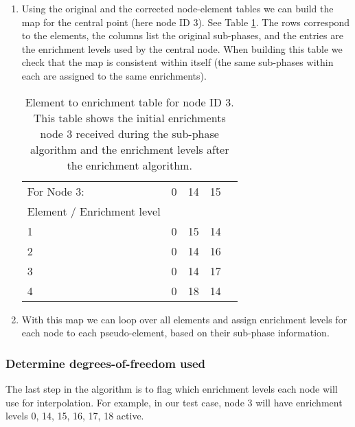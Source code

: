 \begin{enumerate}
\item Using the original and the corrected node-element tables we can build the map for the central point (here node ID 3). See Table \ref{tab:element-to-enrichment-table}. The rows correspond to the elements, the columns list the original sub-phases, and the entries are the enrichment levels used by the central node. When building this table we check that the map is consistent within itself (the same sub-phases within each are assigned to the same enrichments).

\begin{table}[htbp]
	\centering
		\begin{tabular}{| l | p{2cm} | p{2cm} | p{2cm} | p{2cm} |}
		\hline
		For Node 3:		& 0	& 14	& 15\\
		Element / Enrichment level & & &\\ \hline
		1 & 0 & 15 & 14 \\ \hline
		2 & 0 & 14 & 16 \\ \hline
		3 & 0 & 14 & 17 \\ \hline
		4 & 0 & 18 & 14 \\ \hline
		\end{tabular}
	\caption[Element to enrichment table]{Element to enrichment table for node ID 3. This table shows the initial enrichments node 3 received during the sub-phase algorithm and the enrichment levels after the enrichment algorithm.}
	\label{tab:element-to-enrichment-table}
\end{table}

\item With this map we can loop over all elements and assign enrichment levels for each node to each pseudo-element, based on their sub-phase information.
\end{enumerate}


\subsubsection{Determine degrees-of-freedom used}

The last step in the algorithm is to flag which enrichment levels each node will use for interpolation. For example, in our test case, node 3 will have enrichment levels 0, 14, 15, 16, 17, 18 active.


